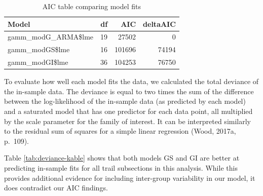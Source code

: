 \documentclass[
]{book}
\begin{document}
\begin{table}

\caption{\label{tab:AICkable}AIC table comparing model fits}
\centering
\begin{tabular}[t]{lrrr}
\toprule
Model & df & AIC & deltaAIC\\
\midrule
gamm\_modG\_ARMA\$lme & 19 & 27502 & 0\\
gamm\_modGS\$lme & 16 & 101696 & 74194\\
gamm\_modGI\$lme & 36 & 104253 & 76750\\
\bottomrule
\end{tabular}
\end{table}

To evaluate how well each model fits the data, we calculated the total deviance of the in-sample data. The deviance is equal to two times the sum of the difference between the log-likelihood of the in-sample data (as predicted by each model) and a saturated model that has one predictor for each data point, all multiplied by the scale parameter for the family of interest. It can be interpreted similarly to the residual sum of squares for a simple linear regression (Wood, 2017a, p.~109).

Table \ref{tab:deviance-kable} shows that both models GS and GI are better at predicting in-sample fits for all trail subsections in this analysis. While this provides additional evidence for including inter-group variability in our model, it does contradict our AIC findings.
\end{document}

